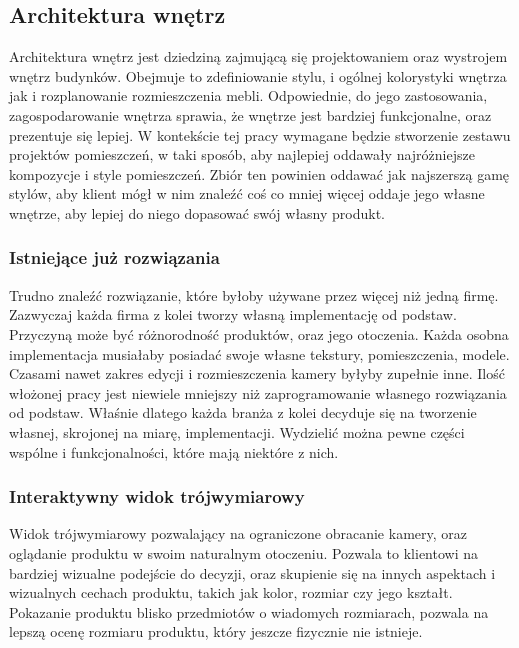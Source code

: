 \documentclass{article} %
\begin{document}
    \subsection{Architektura wnętrz}
        Architektura wnętrz jest dziedziną zajmującą się projektowaniem oraz wystrojem wnętrz budynków. Obejmuje to zdefiniowanie stylu, i ogólnej kolorystyki wnętrza jak i rozplanowanie rozmieszczenia mebli. Odpowiednie, do jego zastosowania, zagospodarowanie wnętrza sprawia, że wnętrze jest bardziej funkcjonalne, oraz prezentuje się lepiej. W kontekście tej pracy wymagane będzie stworzenie zestawu projektów pomieszczeń, w taki sposób, aby najlepiej oddawały najróżniejsze kompozycje i style pomieszczeń. Zbiór ten powinien oddawać jak najszerszą gamę stylów, aby klient mógł w nim znaleźć coś co mniej więcej oddaje jego własne wnętrze, aby lepiej do niego dopasować swój własny produkt.
        \\
        
        \subsubsection{Istniejące już rozwiązania}
        Trudno znaleźć rozwiązanie, które byłoby używane przez więcej niż jedną firmę. Zazwyczaj każda firma z kolei tworzy własną implementację od podstaw. Przyczyną może być różnorodność produktów, oraz jego otoczenia. Każda osobna implementacja musiałaby posiadać swoje własne tekstury, pomieszczenia, modele. Czasami nawet zakres edycji i rozmieszczenia kamery byłyby zupełnie inne. Ilość włożonej pracy jest niewiele mniejszy niż zaprogramowanie własnego rozwiązania od podstaw. Właśnie dlatego każda branża z kolei decyduje się na tworzenie własnej, skrojonej na miarę, implementacji. Wydzielić można pewne części wspólne i funkcjonalności, które mają niektóre z nich. 
        \\
        
        
        \subsubsection{Interaktywny widok trójwymiarowy}
        Widok trójwymiarowy pozwalający na ograniczone obracanie kamery, oraz oglądanie produktu w swoim naturalnym otoczeniu. Pozwala to klientowi na bardziej wizualne podejście do decyzji, oraz skupienie się na innych aspektach i wizualnych cechach produktu, takich jak kolor, rozmiar czy jego kształt. Pokazanie produktu blisko przedmiotów o wiadomych rozmiarach, pozwala na lepszą ocenę rozmiaru produktu, który jeszcze fizycznie nie istnieje.
        \\
        
\end{document}
